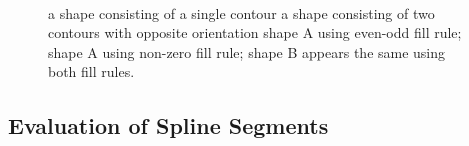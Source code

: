 \documentclass[11pt,a4paper,twoside]{article}
\begin{document}
\begin {figure}
	\centering
	\hspace{0.5cm}
	 \\
	\hspace{0.5cm}
	\hspace{0.5cm}
	\hspace{0.5cm}
	\caption
		{ a shape consisting of a single contour
		 a shape consisting of two contours with opposite orientation
		 shape A using even-odd fill rule;
		 shape A using non-zero fill rule;
		 shape B appears the same using both fill rules.}
	\label {fig:winding}
\end {figure}

\subsection{Evaluation of Spline Segments}
\end{document}
